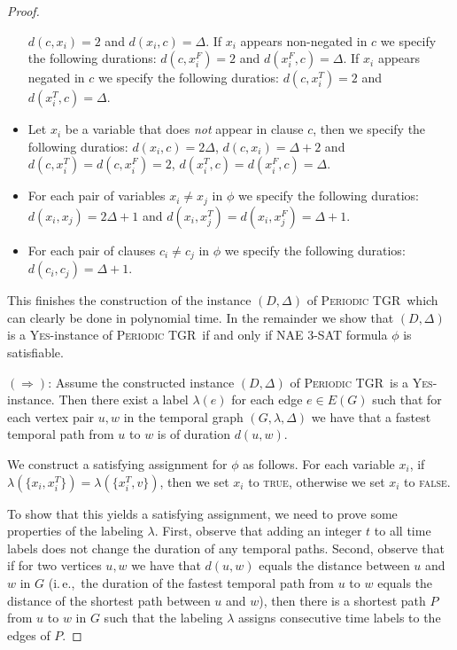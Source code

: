 \documentclass[a4paper,UKenglish,cleveref, autoref, thm-restate, anonymous]{lipics-v2021}
\newcommand{\ie}{i.\,e.,\ }
\newcommand{\deltaExact}{\textsc{Periodic TGR}}
\begin{document}
\begin{proof}
\begin{itemize}
    $d(c,x_i)=2$ and $d(x_i,c)=\Delta$.
    If $x_i$ appears non-negated in $c$ we specify the following durations:
    $d(c,x_i^F)=2$ and $d(x_i^F,c)=\Delta$.
    If $x_i$ appears negated in $c$ we specify the following duratios:
    $d(c,x_i^T)=2$ and $d(x_i^T,c)=\Delta$.
    \item Let $x_i$ be a variable that does \emph{not} appear in clause $c$, then we specify the following duratios:
    $d(x_i,c)=2 \Delta$, $d(c,x_i)=\Delta + 2$
    and
    $d(c,x_i^T)=d(c,x_i^F)=2$, $d(x_i^T,c)=d(x_i^F,c)=\Delta$. 
    \item For each pair of variables $x_i \neq x_j$ in $\phi$ we specify the following duratios:
    $d(x_i,x_j)=2\Delta +1$ and
    $d(x_i,x_j^T)=d(x_i,x_j^F)=\Delta + 1$.
    \item For each pair of clauses $c_i \neq c_j$ in $\phi$ we specify the following duratios:
    $d(c_i,c_j)= \Delta + 1$.
\end{itemize}
This finishes the construction of the instance $(D,\Delta)$ of \deltaExact\, which can clearly be done in polynomial time. In the remainder we show that $(D,\Delta)$ is a \textsc{Yes}-instance of \deltaExact\ if and only if NAE 3-SAT formula $\phi$ is satisfiable.

$(\Rightarrow)$: Assume the constructed instance $(D,\Delta)$ of \deltaExact\ is a \textsc{Yes}-instance. 
Then there exist a label $\lambda(e)$ for each edge $e\in E(G)$ such that for each vertex pair $u,w$ in the temporal graph $(G,\lambda,\Delta)$ we have that a fastest temporal path from $u$ to $w$ is of duration $d(u,w)$. 

We construct a satisfying assignment for $\phi$ as follows. For each variable $x_i$, 
if $\lambda(\{x_i, x_i^T\})=\lambda(\{x_i^T, v\})$, then we set $x_i$ to \textsc{true}, otherwise we set $x_i$ to \textsc{false}.

To show that this yields a satisfying assignment, we need to prove some properties of the labeling $\lambda$.
First, observe that adding an integer $t$ to all time labels does not change the duration of any temporal paths. 
Second, observe that if for two vertices $u,w$ we have that $d(u,w)$ equals the distance between $u$ and $w$ in $G$
(\ie the duration of the fastest temporal path from $u$ to $w$ equals the distance of the shortest path between $u$ and $w$), 
then there is a shortest path $P$ from $u$ to $w$ in $G$ such that 
the labeling $\lambda$ assigns consecutive time labels to the edges of $P$.



\end{proof}
\end{document}
